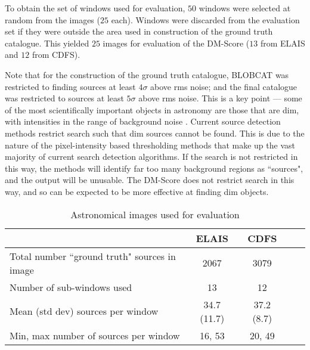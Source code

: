 To obtain the set of windows used for evaluation, $50$ windows were selected at random from the images ($25$ each). Windows were discarded from the evaluation set if they were outside the area used in construction of the ground truth catalogue. This yielded $25$ images for evaluation of the DM-Score ($13$ from ELAIS and $12$ from CDFS).

Note that for the construction of the ground truth catalogue, BLOBCAT was restricted to finding sources at least $4 \sigma$ above rms noise; and the final catalogue was restricted to sources at least $5 \sigma$ above rms noise. This is a key point --- some of the most scientifically important objects in astronomy are those that are dim, with intensities in the range of background noise \cite{norris2011emu}. Current source detection methods restrict search such that dim sources cannot be found. This is due to the nature of the pixel-intensity based thresholding methods that make up the vast majority of current search detection algorithms. If the search is not restricted in this way, the methods will identify far too many background regions as ``sources", and the output will be unusable. The DM-Score does not restrict search in this way, and so can be expected to be more effective at finding dim objects.

\begin{table}
\centering
\caption[Astronomical images used for evaluation of the DM-Score]{Astronomical images used for evaluation}
\begin{tabular}{l c c c c}
\hline
  & ELAIS\protect\footnotemark\cite{norris2006deep}   & CDFS\protect\footnotemark \cite{norris2006deep} \\\hline
Total number ``ground truth" sources in image & 2067         & 3079        \\
Number of sub-windows used                    & 13           & 12          \\
Mean (std dev) sources per window             & 34.7 (11.7)  & 37.2 (8.7)  \\
Min, max number of sources per window         & 16, 53       & 20, 49      \\\hline
\end{tabular}
\label{table:2d-info}
\end{table}
\addtocounter{footnote}{-1}
\addtocounter{footnote}{1}

